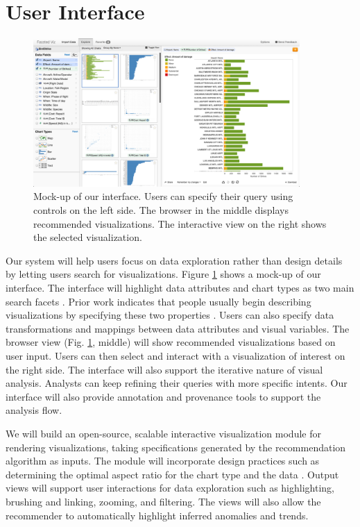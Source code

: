 \section*{User Interface}

\begingroup
\setlength{\columnsep}{16pt}

\begin{figure}
\vspace{-0.3in}
\begin{center}
\includegraphics[width=4in]{ui.png}

\caption{Mock-up of our interface. Users can specify their query using controls on the left side.  The browser in the middle displays recommended visualizations.  The interactive view on the right shows the selected visualization.}
\label{fig:ui}
\end{center}
\vspace{-0.3in}
\end{figure}

Our system will help users focus on data exploration rather than design details by letting users search for visualizations. 
Figure \ref{fig:ui} shows a mock-up of our interface. The interface will highlight data attributes and chart types as two main search facets \cite{yee:faceted}. Prior work indicates that people usually begin describing visualizations by specifying these two properties \cite{grammel:novice}.  Users can also specify data transformations and mappings between data attributes and visual variables. The browser view (Fig. \ref{fig:ui}, middle) will show recommended visualizations based on user input.  Users can then select and interact with a visualization of interest on the right side. The interface will also support the iterative nature of visual analysis.  Analysts can keep refining their queries with more specific intents.  Our interface will also provide annotation and provenance tools to support the analysis flow.


\endgroup

We will build an open-source, scalable interactive visualization module for rendering visualizations, taking specifications generated by the recommendation algorithm as inputs. The module will incorporate design practices such as determining the optimal aspect ratio for the chart type and the data \cite{talbot:arc}.  Output views will support user interactions \cite{heer:dynamics} for data exploration such as highlighting, brushing and linking, zooming, and filtering. The views will also allow the recommender to automatically highlight inferred anomalies and trends.